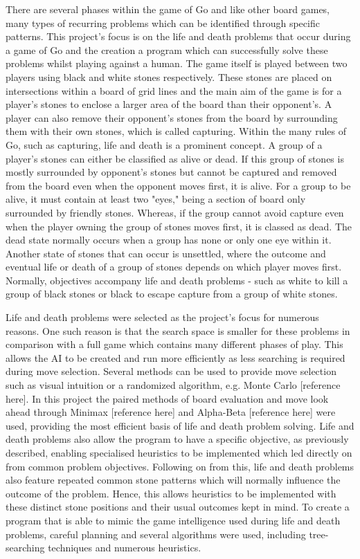 \documentclass{l3proj}
\begin{document}
There are several phases within the game of Go and like other board games, many types of recurring problems which can be identified through specific patterns. This project's focus is on the life and death problems that occur during a game of Go and the creation a program which can successfully solve these problems whilst playing against a human. The game itself is played between two players using black and white stones respectively. These stones are placed on intersections within a board of grid lines and the main aim of the game is for a player's stones to enclose a larger area of the board than their opponent's. A player can also remove their opponent's stones from the board by surrounding them with their own stones, which is called capturing. Within the many rules of Go, such as capturing, life and death is a prominent concept. A group of a player's stones can either be classified as alive or dead. If this group of stones is mostly surrounded by opponent's stones but cannot be captured and removed from the board even when the opponent moves first, it is alive. For a group to be alive, it must contain at least two "eyes," being a section of board only surrounded by friendly stones. Whereas, if the group cannot avoid capture even when the player owning the group of stones moves first, it is classed as dead. The dead state normally occurs when a group has none or only one eye within it. Another state of stones that can occur is unsettled, where the outcome and eventual life or death of a group of stones depends on which player moves first. Normally, objectives accompany life and death problems - such as white to kill a group of black stones or black to escape capture from a group of white stones.

Life and death problems were selected as the project's focus for numerous reasons. One such reason is that the search space is smaller for these problems in comparison with a full game which contains many different phases of play.  This allows the AI to be created and run more efficiently as less searching is required during move selection. Several methods can be used to provide move selection such as visual intuition or a randomized algorithm, e.g. Monte Carlo [reference here]. In this project the paired methods of board evaluation and move look ahead through Minimax [reference here] and Alpha-Beta [reference here] were used, providing the most efficient basis of life and death problem solving. Life and death problems also allow the program to have a specific objective, as previously described, enabling specialised heuristics to be implemented which led directly on from common problem objectives. Following on from this, life and death problems also feature repeated common stone patterns which will normally influence the outcome of the problem. Hence, this allows heuristics to be implemented with these distinct stone positions and their usual outcomes kept in mind. To create a program that is able to mimic the game intelligence used during life and death problems, careful planning and several algorithms were used, including tree-searching techniques and numerous heuristics.
\end{document}
